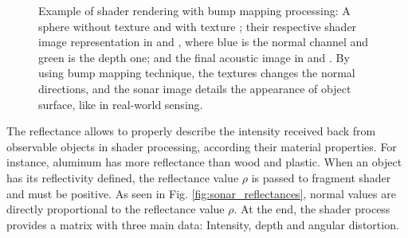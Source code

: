 \documentclass[final,5p,times]{elsarticle}
\begin{document}
\begin{figure}[t]
{        \label{fig:bump_5}
    }
    \captionsetup{justification=centering}
    \caption{Example of shader rendering with bump mapping processing:
    A sphere without texture  and with texture
    ; their respective shader image representation
    in  and , where blue is the
    normal channel and green is the depth one; and the final acoustic
    image in  and . By using
    bump mapping technique, the textures changes the normal directions,
    and the sonar image details the appearance of object surface, like
    in real-world sensing.}
    \label{fig:sonar_bump_mapping}
\end{figure}

The reflectance allows to properly describe the intensity received back
from observable objects in shader processing, according their material
properties. For instance, aluminum has more reflectance than wood and
plastic. When an object has its reflectivity defined, the reflectance
value $\rho$ is passed to fragment shader and must be positive. As seen
in Fig. \ref{fig:sonar_reflectances}, normal values are directly
proportional to the reflectance value $\rho$. At the end, the shader process
provides a matrix with three main data: Intensity, depth and
angular distortion.
\end{document}
